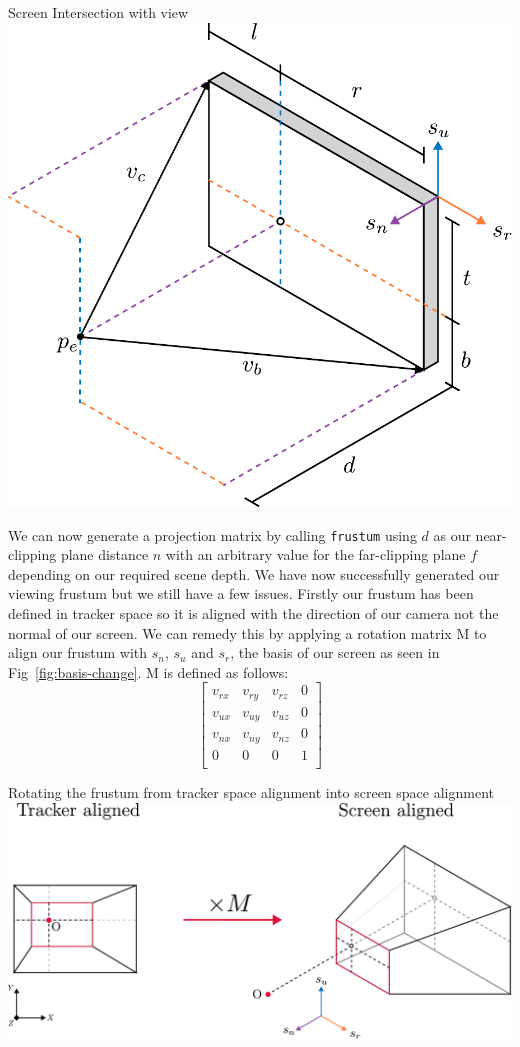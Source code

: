 \begin{figureBox}[label={fig:screen-extents}, width=0.8\linewidth]{Screen Intersection with view}
    \includegraphics[width = 0.5\linewidth]{./background/figures/projection/eye-projection.pdf}
\end{figureBox}

We can now generate a projection matrix by calling \texttt{frustum} using $d$ as our near-clipping plane distance $n$ with an arbitrary value for the far-clipping plane $f$ depending on our required scene depth. We have now successfully generated our viewing frustum but we still have a few issues. Firstly our frustum has been defined in tracker space so it is aligned with the direction of our camera not the normal of our screen. We can remedy this by applying a rotation matrix M to align our frustum with $s_n$, $s_u$ and $s_r$, the basis of our screen as seen in Fig~\ref{fig:basis-change}. M is defined as follows:
\[
    \begin{bmatrix}
        v_{rx} & v_{ry} & v_{rz} & 0 \\
        v_{ux} & v_{uy} & v_{uz} & 0 \\
        v_{nx} & v_{ny} & v_{nz} & 0 \\
        0      & 0      & 0      & 1 \\
    \end{bmatrix}
\]

\begin{figureBox}[label={fig:basis-change}, width=0.8\linewidth]{Rotating the frustum from tracker space alignment into screen space alignment}
    \includegraphics[width = 0.8\linewidth]{./background/figures/projection/realignment.pdf}
\end{figureBox}

